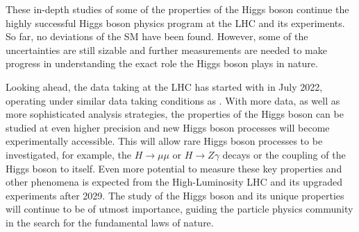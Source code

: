 These in-depth studies of some of the properties of the Higgs boson continue the highly successful Higgs boson physics program at the LHC and its experiments. 
So far, no deviations of the SM have been found. However, some of the uncertainties are still sizable and further measurements are needed to make progress in understanding the exact role the Higgs boson plays in nature. 


Looking ahead, the data taking at the LHC has started with \RunThr in July 2022, operating under similar data taking conditions as \RunTwo. 
With more data, as well as more sophisticated analysis strategies, the properties of the Higgs boson can be studied at even higher precision and new Higgs boson processes will become experimentally accessible. 
This will allow rare Higgs boson processes to be investigated, for example, the $H \to \mu\mu$ or $H \to Z\gamma$ decays or the coupling of the Higgs boson to itself.
Even more potential to measure these key properties and other phenomena is expected from the High-Luminosity LHC and its upgraded experiments after 2029.
The study of the Higgs boson and its unique properties will continue to be of utmost importance, guiding the particle physics community in the search for the fundamental laws of nature. 

